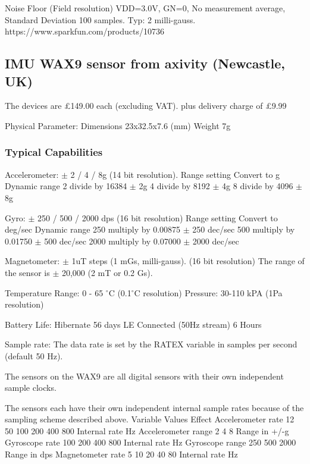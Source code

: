  Noise Floor (Field resolution) VDD=3.0V, GN=0, No measurement average,
 Standard Deviation 100 samples. Typ: 2 milli-gauss.
 https://www.sparkfun.com/products/10736




 \subsection*{IMU WAX9 sensor from axivity (Newcastle, UK)}

 The devices are £149.00 each (excluding VAT).
 plus delivery charge of £9.99


 Physical Parameter:
 Dimensions 	23x32.5x7.6 (mm)
 Weight 	7g


 \subsubsection*{Typical Capabilities}

 Accelerometer:	$\pm$ 2 / 4 / 8g (14 bit resolution).
 Range setting 	Convert to g 	Dynamic range
 2 	divide by 16384 $\pm$ 2g
 4 	divide by 8192 	$\pm$ 4g
 8 	divide by 4096 	$\pm$ 8g


Gyro: 	$\pm$ 250 / 500 / 2000 dps (16 bit resolution)
Range setting 	Convert to deg/sec 	Dynamic range
250 	multiply by 0.00875 	$\pm$ 250 dec/sec
500 	multiply by 0.01750 	$\pm$ 500 dec/sec
2000 	multiply by 0.07000 	$\pm$ 2000 dec/sec

 Magnetometer: 	$\pm$ 1uT steps (1 mGs, milli-gauss). (16 bit resolution)
 The range of the sensor is $\pm$ 20,000 (2 mT or 0.2 Gs).

Temperature Range: 	0 - 65 $^{\circ}$C (0.1$^{\circ}$C resolution)
Pressure: 	30-110 kPA (1Pa resolution)


 Battery Life:
 Hibernate 	56 days
 LE Connected (50Hz stream) 	6 Hours

 Sample rate:
 The data rate is set by the RATEX variable in samples per second (default 50 Hz).

 The sensors on the WAX9 are all digital sensors with their own independent sample clocks.

 The sensors each have their own independent internal sample rates because of the
 sampling scheme described above.
 Variable 	Values 	Effect
 Accelerometer rate 	12 50 100 200 400 800 	Internal rate Hz
 Accelerometer range 	2 4 8 	Range in +/-g
 Gyroscope rate 	100 200 400 800 	Internal rate Hz
 Gyroscope range 	250 500 2000 	Range in dps
 Magnetometer rate 	5 10 20 40 80 	Internal rate Hz

